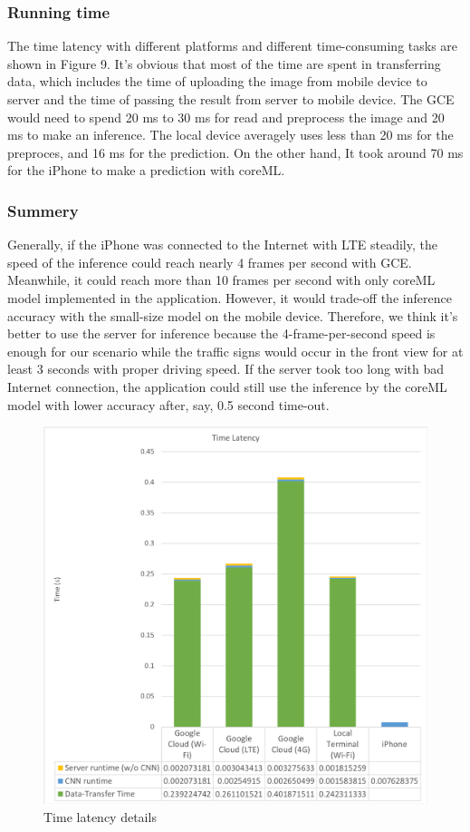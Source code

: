 \documentclass[conference]{IEEEtran}
\begin{document}
\subsubsection{Running time}
The time latency with different platforms and different time-consuming tasks are shown in Figure 9. It's obvious that most of the time are spent in transferring data, which includes the time of uploading the image from mobile device to server and the time of passing the result from server to mobile device. The GCE would need to spend 20 ms to 30 ms for read and preprocess the image and 20 ms to make an inference. The local device averagely uses less than 20 ms for the preproces, and 16 ms for the prediction. On the other hand, It took around 70 ms for the iPhone to make a prediction with coreML.
\subsubsection{Summery}
Generally, if the iPhone was connected to the Internet with LTE steadily, the speed of the inference could reach nearly 4 frames per second with GCE. Meanwhile, it could reach more than 10 frames per second with only coreML model implemented in the application. However, it would trade-off the inference accuracy with the small-size model on the mobile device. Therefore, we think it's better to use the server for inference because the 4-frame-per-second speed is enough for our scenario while the traffic signs would occur in the front view for at least 3 seconds with proper driving speed. If the server took too long with bad Internet connection, the application could still use the inference by the coreML model with lower accuracy after, say, 0.5 second time-out. 
\begin{figure}[H]
\centering
  \begin{minipage}{.4\textwidth}
    \centering
    \includegraphics[width=1.0\linewidth]{latency_chart.png}
    \caption{Time latency details}
    \label{fig:fig_1}
  \end{minipage}
\end{figure}
\end{document}
